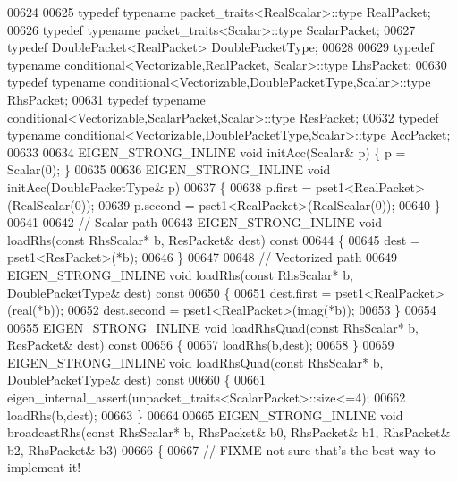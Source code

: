\begin{DoxyCode}
00624   
00625   \textcolor{keyword}{typedef} \textcolor{keyword}{typename} packet\_traits<RealScalar>::type RealPacket;
00626   \textcolor{keyword}{typedef} \textcolor{keyword}{typename} packet\_traits<Scalar>::type     ScalarPacket;
00627   \textcolor{keyword}{typedef} DoublePacket<RealPacket> DoublePacketType;
00628 
00629   \textcolor{keyword}{typedef} \textcolor{keyword}{typename} conditional<Vectorizable,RealPacket,  Scalar>::type LhsPacket;
00630   \textcolor{keyword}{typedef} \textcolor{keyword}{typename} conditional<Vectorizable,DoublePacketType,Scalar>::type RhsPacket;
00631   \textcolor{keyword}{typedef} \textcolor{keyword}{typename} conditional<Vectorizable,ScalarPacket,Scalar>::type ResPacket;
00632   \textcolor{keyword}{typedef} \textcolor{keyword}{typename} conditional<Vectorizable,DoublePacketType,Scalar>::type AccPacket;
00633   
00634   EIGEN\_STRONG\_INLINE \textcolor{keywordtype}{void} initAcc(Scalar& p) \{ p = Scalar(0); \}
00635 
00636   EIGEN\_STRONG\_INLINE \textcolor{keywordtype}{void} initAcc(DoublePacketType& p)
00637   \{
00638     p.first   = pset1<RealPacket>(RealScalar(0));
00639     p.second  = pset1<RealPacket>(RealScalar(0));
00640   \}
00641 
00642   \textcolor{comment}{// Scalar path}
00643   EIGEN\_STRONG\_INLINE \textcolor{keywordtype}{void} loadRhs(\textcolor{keyword}{const} RhsScalar* b, ResPacket& dest)\textcolor{keyword}{ const}
00644 \textcolor{keyword}{  }\{
00645     dest = pset1<ResPacket>(*b);
00646   \}
00647 
00648   \textcolor{comment}{// Vectorized path}
00649   EIGEN\_STRONG\_INLINE \textcolor{keywordtype}{void} loadRhs(\textcolor{keyword}{const} RhsScalar* b, DoublePacketType& dest)\textcolor{keyword}{ const}
00650 \textcolor{keyword}{  }\{
00651     dest.first  = pset1<RealPacket>(real(*b));
00652     dest.second = pset1<RealPacket>(imag(*b));
00653   \}
00654   
00655   EIGEN\_STRONG\_INLINE \textcolor{keywordtype}{void} loadRhsQuad(\textcolor{keyword}{const} RhsScalar* b, ResPacket& dest)\textcolor{keyword}{ const}
00656 \textcolor{keyword}{  }\{
00657     loadRhs(b,dest);
00658   \}
00659   EIGEN\_STRONG\_INLINE \textcolor{keywordtype}{void} loadRhsQuad(\textcolor{keyword}{const} RhsScalar* b, DoublePacketType& dest)\textcolor{keyword}{ const}
00660 \textcolor{keyword}{  }\{
00661     eigen\_internal\_assert(unpacket\_traits<ScalarPacket>::size<=4);
00662     loadRhs(b,dest);
00663   \}
00664   
00665   EIGEN\_STRONG\_INLINE \textcolor{keywordtype}{void} broadcastRhs(\textcolor{keyword}{const} RhsScalar* b, RhsPacket& b0, RhsPacket& b1, RhsPacket& b2, 
      RhsPacket& b3)
00666   \{
00667     \textcolor{comment}{// FIXME not sure that's the best way to implement it!}

\end{DoxyCode}
